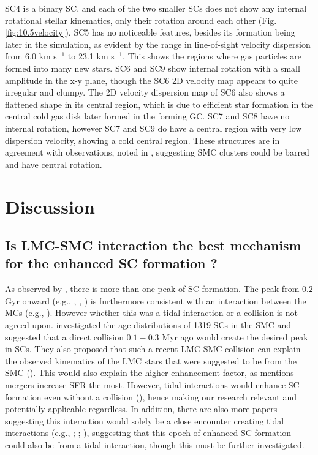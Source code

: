 \documentclass[fleqn,usenatbib]{mnras}
\begin{document}
SC4 is a binary SC, and each of the two smaller SCs does not show any internal rotational stellar kinematics, only their rotation around each other (Fig. \ref{fig:10.5velocity}). SC5 has no noticeable features, besides its formation being later in the simulation, as evident by the range in line-of-sight velocity dispersion from 6.0 km s$^{-1}$ to 23.1 km s$^{-1}$. This shows the regions where gas particles are formed into many new stars. %
SC6 and SC9 show internal rotation with a small amplitude in the x-y plane, though the SC6 2D velocity map appears to quite irregular and clumpy. The 2D velocity dispersion map of SC6 also shows a flattened shape in its central region, which is due to efficient star formation in the central cold gas disk later formed in the forming GC.
SC7 and SC8 have no internal rotation, however SC7 and SC9 do have a central region with very low dispersion velocity, showing a cold central region.
These structures are in agreement with observations, noted in \cite{17Bekki_Chiba2009}, suggesting SMC clusters could be barred and have central rotation. %
%
\section{Discussion}
\label{sec:discussion}
\subsection{Is LMC-SMC interaction the best mechanism
for the enhanced SC formation ?}


As observed by \cite{1Rafelski_Zaritsky2005}, there is more than one peak of SC formation. The peak from $0.2$ Gyr onward (e.g., \citealt{27Grebel_et_al1999}, \citealt{40Glatt_Grebel_Koch2010}, \citealt{11Bitsakis_et_al2018}) is furthermore consistent with an interaction between the MCs (e.g., \citealt{17Bekki_Chiba2009}). However whether this was a tidal interaction or a collision is not agreed upon. \cite{11Bitsakis_et_al2018} 
investigated the age distributions of 1319 SCs in the SMC and suggested that a direct collision $0.1-0.3$ Myr ago would create the desired peak in SCs. They also proposed that such a recent LMC-SMC collision can explain the observed kinematics of the LMC stars that were suggested to be from the SMC (\citealt{18Olsen_et_al2011}). This would also explain the higher enhancement factor, as \cite{23Knapen_Querejeta2015} mentions mergers increase SFR the most. However, tidal interactions would enhance SC formation even without a collision (\citealt{79Bekki_et_al2004}), hence making our research relevant and potentially applicable regardless. 
In addition, there are also more papers suggesting this interaction would solely be a close encounter creating tidal interactions (e.g., \citealt{27Grebel_et_al1999}; \citealt{40Glatt_Grebel_Koch2010}; \citealt{39Nayak_et_al2018}), suggesting that this epoch of enhanced SC formation could also be from a tidal interaction, though this must be further investigated. 
\end{document}
